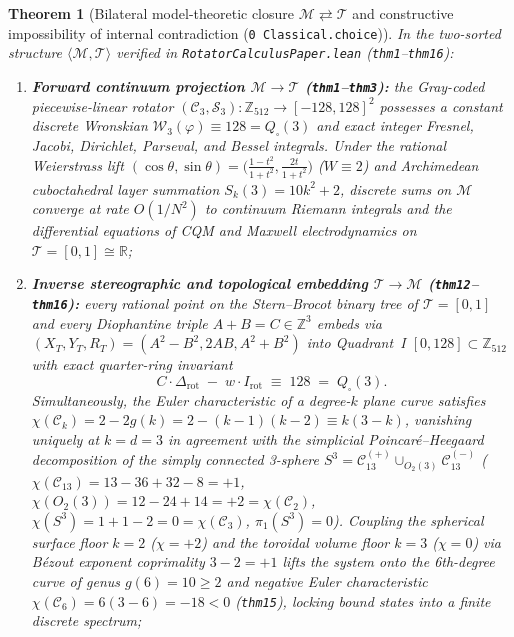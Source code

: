 \documentclass[11pt,a4paper]{article}
\newtheorem{theorem}{Theorem}[section]
\theoremstyle{definition}
\theoremstyle{remark}
\begin{document}
\begin{theorem}[Bilateral model-theoretic closure $\mathcal{M} \rightleftarrows \mathcal{T}$ and constructive impossibility of internal contradiction (\texttt{0 Classical.choice})]
\label{thm:bilateral-closure}
In the two-sorted structure $\langle\mathcal{M},\mathcal{T}\rangle$ verified in \texttt{RotatorCalculusPaper.lean} (\texttt{thm1}--\texttt{thm16}):
\begin{enumerate}[label=\textbf{(\roman*)},leftmargin=*]
\item \textbf{Forward continuum projection $\mathcal{M} \to \mathcal{T}$ (\texttt{thm1}--\texttt{thm3}):}
  the Gray-coded piecewise-linear rotator $(\mathcal{C}_3,\mathcal{S}_3) : \mathbb{Z}_{512}\to[-128,128]^2$ possesses a constant discrete Wronskian $\mathcal{W}_3(\varphi) \equiv 128 = Q_\square(3)$ and exact integer Fresnel, Jacobi, Dirichlet, Parseval, and Bessel integrals. Under the rational Weierstrass lift $(\cos\theta,\sin\theta) = \bigl(\frac{1-t^2}{1+t^2},\frac{2t}{1+t^2}\bigr)$ ($W\equiv 2$) and Archimedean cuboctahedral layer summation $S_k(3) = 10k^2 + 2$, discrete sums on $\mathcal{M}$ converge at rate $O(1/N^2)$ to continuum Riemann integrals and the differential equations of CQM and Maxwell electrodynamics on $\mathcal{T} = [0,1]\cong\mathbb{R}$;
\item \textbf{Inverse stereographic and topological embedding $\mathcal{T} \to \mathcal{M}$ (\texttt{thm12}--\texttt{thm16}):}
  every rational point on the Stern--Brocot binary tree of $\mathcal{T} = [0,1]$ and every Diophantine triple $A+B=C\in\mathbb{Z}^3$ embeds via $(X_T,Y_T,R_T) = (A^2-B^2,2AB,A^2+B^2)$ into Quadrant~I $[0,128]\subset\mathbb{Z}_{512}$ with exact quarter-ring invariant
  \begin{equation}
    \label{eq:quarter-ring-lock}
    C\cdot\Delta_{\mathrm{rot}} \;-\; w\cdot I_{\mathrm{rot}} \;\equiv\; 128 \;=\; Q_\square(3).
  \end{equation}
  Simultaneously, the Euler characteristic of a degree-$k$ plane curve satisfies $\chi(\mathcal{C}_k) = 2-2g(k) = 2-(k-1)(k-2) \equiv k(3-k)$, vanishing uniquely at $k = d = 3$ in agreement with the simplicial Poincar\'e--Heegaard decomposition of the simply connected 3-sphere $S^3 = \mathcal{C}_{13}^{(+)}\cup_{O_2(3)}\mathcal{C}_{13}^{(-)}$ ($\chi(\mathcal{C}_{13}) = 13-36+32-8 = +1$, $\chi(O_2(3)) = 12-24+14 = +2 = \chi(\mathcal{C}_2)$, $\chi(S^3) = 1+1-2 = 0 = \chi(\mathcal{C}_3)$, $\pi_1(S^3)=0$). Coupling the spherical surface floor $k=2$ ($\chi=+2$) and the toroidal volume floor $k=3$ ($\chi=0$) via Bézout exponent coprimality $3-2=+1$ lifts the system onto the 6th-degree curve of genus $g(6)=10\ge 2$ and negative Euler characteristic $\chi(\mathcal{C}_6) = 6(3-6) = -18 < 0$ (\texttt{thm15}), locking bound states into a finite discrete spectrum;

\end{enumerate}
\end{theorem}
\end{document}

